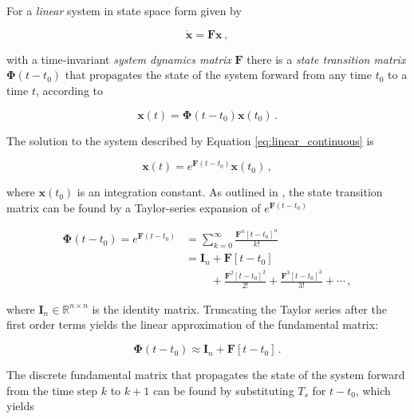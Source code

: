 For a \emph{linear} system in state space form given by

\begin{equation}\label{eq:linear_continuous}
  \dot{\mathbf{x}} = \mathbf{F} \mathbf{x}\,,
\end{equation}

\noindent
with a time-invariant \emph{system dynamics matrix} $\mathbf{F}$ there is a \emph{state transition matrix} $\bm{\Phi}(t-t_0)$ that propagates the state of the system forward from any time $t_0$ to a time $t$, according to

\begin{equation}
  \mathbf{x}(t) = \bm{\Phi}(t-t_0) \mathbf{x}(t_0)\,.
\end{equation}

\noindent
The solution to the system described by Equation \ref{eq:linear_continuous} is 

\begin{equation}
  \mathbf{x}(t) = e^{\mathbf{F}(t-t_0)} \mathbf{x}(t_0)\,,
\end{equation}

\noindent
where $\mathbf{x}(t_0)$ is an integration constant. As outlined in \cite{zarchan2009fundamentals}, the state transition matrix can be found by a Taylor-series expansion of $e^{\mathbf{F}(t-t_0)}$

\begin{equation}
\begin{split}
  \bm{\Phi}(t-t_0) = e^{\mathbf{F}(t-t_0)} &= \sum_{k=0} ^ {\infty} \frac {\mathbf{F}^{n} [t-t_0]^n}{k!} \\
  &= \mathbf{I}_n + \mathbf{F}[t-t_0] \\ 
  & \mathrel{\phantom{= \mathbf{I}_n}} + \frac{\mathbf{F}^2 [t-t_0]^2}{2!} +\frac{\mathbf{F}^{3} [t-t_0]^3}{3!} + \cdots\,,
\end{split}
\end{equation}
 
\noindent
where $\mathbf{I}_n \in \mathbb{R}^{n \times n}$ is the identity matrix. Truncating the Taylor series after the first order terms yields the linear approximation of the fundamental matrix:

\begin{equation}
  \bm{\Phi}(t-t_0) \approx \mathbf{I}_n + \mathbf{F}[t-t_0]\,.
\end{equation}

\noindent
The discrete fundamental matrix that propagates the state of the system forward from the time step $k$ to $k+1$ can be found by substituting $T_s$ for $t-t_0$, which yields

